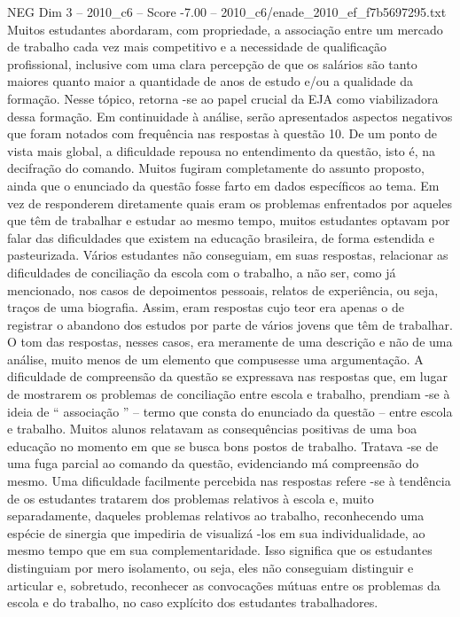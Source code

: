 \begin{textsample}{NEG Dim 3 – 2010\_c6 – Score -7.00 – 2010\_c6/enade\_2010\_ef\_f7b5697295.txt}
Muitos estudantes abordaram, com propriedade, a associação entre um mercado de trabalho cada vez mais competitivo e a necessidade de qualificação profissional, inclusive com uma clara percepção de que os salários são tanto maiores quanto maior a quantidade de anos de estudo e/ou a qualidade da formação.
Nesse tópico, retorna -se ao papel crucial da EJA como viabilizadora dessa formação.
Em continuidade à análise, serão apresentados aspectos negativos que foram notados com frequência nas respostas à questão 10.
De um ponto de vista mais global, a dificuldade repousa no entendimento da questão, isto é, na decifração do comando.
Muitos fugiram completamente do assunto proposto, ainda que o enunciado da questão fosse farto em dados específicos ao tema.
Em vez de responderem diretamente quais eram os problemas enfrentados por aqueles que têm de trabalhar e estudar ao mesmo tempo, muitos estudantes optavam por falar das dificuldades que existem na educação brasileira, de forma estendida e pasteurizada.
Vários estudantes não conseguiam, em suas respostas, relacionar as dificuldades de conciliação da escola com o trabalho, a não ser, como já mencionado, nos casos de depoimentos pessoais, relatos de experiência, ou seja, traços de uma biografia.
Assim, eram respostas cujo teor era apenas o de registrar o abandono dos estudos por parte de vários jovens que têm de trabalhar.
O tom das respostas, nesses casos, era meramente de uma descrição e não de uma análise, muito menos de um elemento que compusesse uma argumentação.
A dificuldade de compreensão da questão se expressava nas respostas que, em lugar de mostrarem os problemas de conciliação entre escola e trabalho, prendiam -se à ideia de “ associação ” – termo que consta do enunciado da questão – entre escola e trabalho.
Muitos alunos relatavam as consequências positivas de uma boa educação no momento em que se busca bons postos de trabalho.
Tratava -se de uma fuga parcial ao comando da questão, evidenciando má compreensão do mesmo.
Uma dificuldade facilmente percebida nas respostas refere -se à tendência de os estudantes tratarem dos problemas relativos à escola e, muito separadamente, daqueles problemas relativos ao trabalho, reconhecendo uma espécie de sinergia que impediria de visualizá -los em sua individualidade, ao mesmo tempo que em sua complementaridade.
Isso significa que os estudantes distinguiam por mero isolamento, ou seja, eles não conseguiam distinguir e articular e, sobretudo, reconhecer as convocações mútuas entre os problemas da escola e do trabalho, no caso explícito dos estudantes trabalhadores.

\end{textsample}
